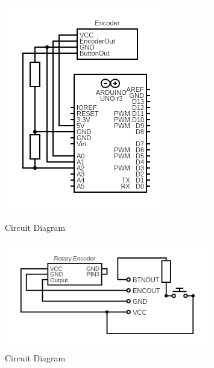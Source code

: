 \documentclass{article}
\begin{document}
            \begin{figure}[h!]
                \centering
                \begin{minipage}[b]{0.5\textwidth}
                    \centering
                    \includegraphics[width = \textwidth]{Documentation Assets/CircuitDiagramModular.png}
                    \caption{Circuit Diagram}
                \end{minipage} \hfill
                \begin{minipage}[b]{0.45\textwidth}
                    \centering
                    \includegraphics[angle = -90, width = 0.8\textwidth]{Documentation Assets/EncoderPCB.png}
                    \caption{Circuit Diagram}
                \end{minipage} \hfill
            \end{figure}
\end{document}
